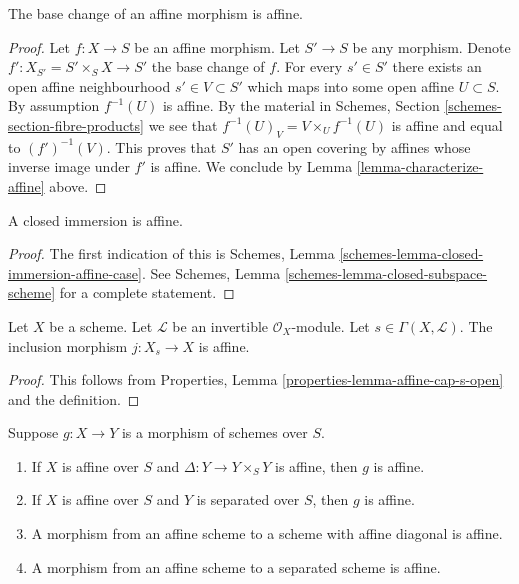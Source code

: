 \begin{lemma}
\label{lemma-base-change-affine}
The base change of an affine morphism is affine.
\end{lemma}

\begin{proof}
Let $f : X \to S$ be an affine morphism. Let $S' \to S$ be any morphism.
Denote $f' : X_{S'} = S' \times_S X \to S'$ the base change of $f$.
For every $s' \in S'$ there exists an open affine neighbourhood
$s' \in V \subset S'$ which maps into some open affine $U \subset S$.
By assumption $f^{-1}(U)$ is affine. By the material in
Schemes, Section \ref{schemes-section-fibre-products} we see
that $f^{-1}(U)_V = V \times_U f^{-1}(U)$ is affine and equal
to $(f')^{-1}(V)$. This proves that $S'$ has an open covering by
affines whose inverse image under $f'$ is affine. We conclude
by Lemma \ref{lemma-characterize-affine} above.
\end{proof}

\begin{lemma}
\label{lemma-closed-immersion-affine}
A closed immersion is affine.
\end{lemma}

\begin{proof}
The first indication of this is
Schemes, Lemma \ref{schemes-lemma-closed-immersion-affine-case}.
See Schemes, Lemma \ref{schemes-lemma-closed-subspace-scheme}
for a complete statement.
\end{proof}

\begin{lemma}
\label{lemma-affine-s-open}
Let $X$ be a scheme.
Let $\mathcal{L}$ be an invertible $\mathcal{O}_X$-module.
Let $s \in \Gamma(X, \mathcal{L})$.
The inclusion morphism $j : X_s \to X$ is affine.
\end{lemma}

\begin{proof}
This follows from Properties, Lemma \ref{properties-lemma-affine-cap-s-open}
and the definition.
\end{proof}

\begin{lemma}
\label{lemma-affine-permanence}
Suppose $g : X \to Y$ is a morphism of schemes over $S$.
\begin{enumerate}
\item If $X$ is affine over $S$ and $\Delta : Y \to Y \times_S Y$ is affine,
then $g$ is affine.
\item If $X$ is affine over $S$ and $Y$ is separated over $S$,
then $g$ is affine.
\item A morphism from an affine scheme to a scheme with affine
diagonal is affine.
\item A morphism from an affine scheme to a separated scheme is affine.
\end{enumerate}
\end{lemma}

